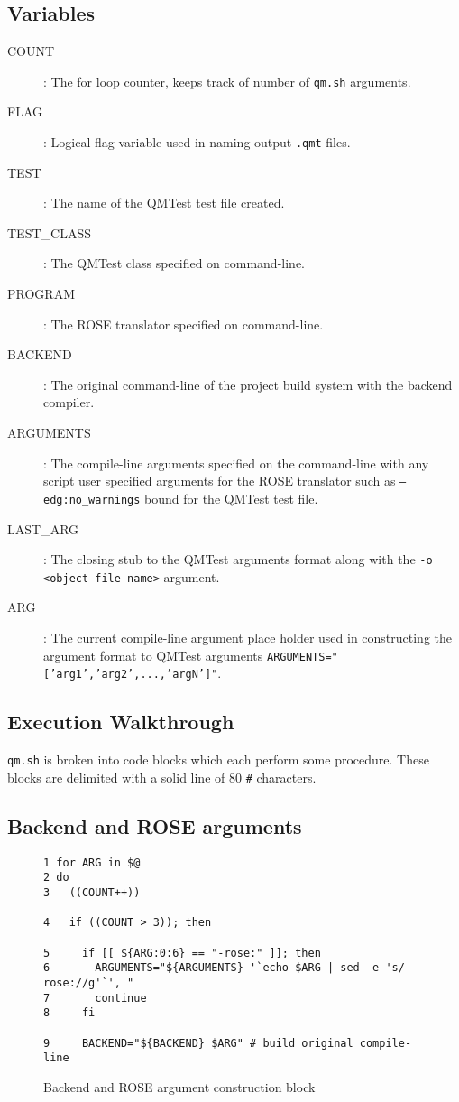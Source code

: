 \subsection{Variables}

\begin{description}
  \item[COUNT] : The for loop counter, keeps track of number of {\tt qm.sh}
	arguments.
  \item[FLAG] : Logical flag variable used in naming output {\tt .qmt} files.
  \item[TEST] : The name of the QMTest test file created.
  \item[TEST\_CLASS] : The QMTest class specified on command-line.
  \item[PROGRAM] : The ROSE translator specified on command-line.
  \item[BACKEND] : The original command-line of the project build system with
	the backend compiler.
  \item[ARGUMENTS] : The compile-line arguments specified on the command-line
	with any script user specified arguments for the ROSE translator such
	as {\tt --edg:no\_warnings} bound for the QMTest test file.
  \item[LAST\_ARG] : The closing stub to the QMTest arguments format along with
	the {\tt -o <object file name>} argument.
  \item[ARG] : The current compile-line argument place holder used in
	constructing the argument format to QMTest arguments
	{\tt ARGUMENTS="['arg1','arg2',...,'argN']"}. 

\end{description}

\subsection{Execution Walkthrough}
{\tt qm.sh} is broken into code blocks which each perform some procedure. These
blocks are delimited with a solid line of 80 {\tt \#} characters.

\subsection{Backend and ROSE arguments}

\begin{figure}[!ht]
{\scriptsize
\begin{verbatim}
1 for ARG in $@
2 do
3   ((COUNT++))
                                                                                
4   if ((COUNT > 3)); then
                                                                                
5     if [[ ${ARG:0:6} == "-rose:" ]]; then
6       ARGUMENTS="${ARGUMENTS} '`echo $ARG | sed -e 's/-rose://g'`', "
7       continue
8     fi
                                                                                
9     BACKEND="${BACKEND} $ARG" # build original compile-line
\end{verbatim}
}
\caption{Backend and ROSE argument construction block}
\end{figure}

